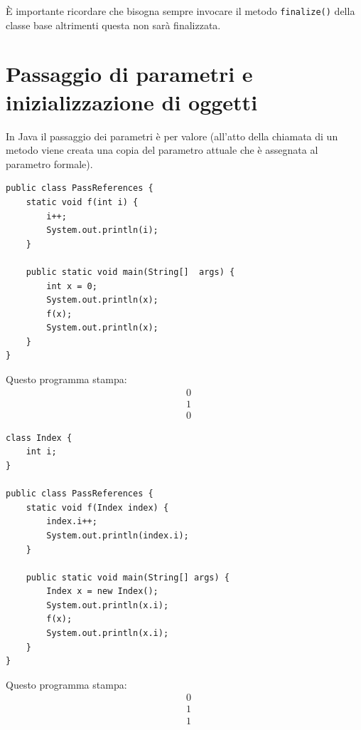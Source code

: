 \documentclass[12pt]{report}
\begin{document}
È importante ricordare che bisogna sempre invocare il metodo \texttt{finalize()} della classe base altrimenti questa non sarà finalizzata.
\section{Passaggio di parametri e inizializzazione di oggetti}
In Java il passaggio dei parametri è per valore (all'atto della chiamata di un metodo viene creata una copia del parametro attuale che è assegnata al parametro formale).
\begin{lstlisting}[style=javastyle]
public class PassReferences {
	static void f(int i) {
		i++;
		System.out.println(i);
	}

	public static void main(String[]  args) {
		int x = 0;
		System.out.println(x);
		f(x);
		System.out.println(x);
	}
}
\end{lstlisting}
Questo programma stampa:
\begin{align*}
	&0 \\
	&1 \\
	&0
\end{align*}
\begin{lstlisting}[style=javastyle]
class Index {
	int i;
}

public class PassReferences {
	static void f(Index index) {
		index.i++;
		System.out.println(index.i);
	}

	public static void main(String[] args) {
		Index x = new Index();
		System.out.println(x.i);
		f(x);
		System.out.println(x.i);
	}
}
\end{lstlisting}
Questo programma stampa:
\begin{align*}
	&0 \\
	&1 \\
	&1
\end{align*}
\end{document}
